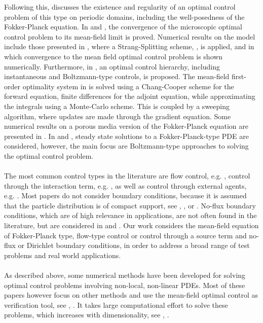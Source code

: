 Following this, \cite{carrillo2019mean} discusses the existence and regularity of an optimal control problem of this type on periodic domains, including the well-posedness of the Fokker-Planck equation. In \cite{Pinnau_2017} and  \cite{carrillo2018no1}, the convergence of the microscopic optimal control problem to its mean-field limit is proved.
Numerical results on the model include those presented in \cite{Pinnau_2017}, where a Strang-Splitting scheme, \cite{gilbertstrang1}, is applied, and in which convergence to the mean field optimal control problem is shown numerically. Furthermore, in \cite{albi2016mean}, an optimal control hierarchy, including instantaneous and Boltzmann-type controls, is proposed. The mean-field first-order optimality system in \cite{albi2016mean} is solved using a Chang-Cooper scheme for the forward equation, finite differences for the adjoint equation, while approximating the integrals using a Monte-Carlo scheme. This is coupled by a sweeping algorithm, where updates are made through the gradient equation.
Some numerical results on a porous media version of the Fokker-Planck equation are presented in \cite{carrillo2018no1}. In \cite{Albi_2014no1} and \cite{albi2014kinetic}, steady state solutions to a Fokker-Planck-type PDE are considered, however, the main focus  are Boltzmann-type approaches to solving the optimal control problem.
\\
\\
The most common control types in the literature are flow control, e.g. \cite{albi2016mean}, control through the interaction term, e.g. \cite{Fornasier_2014no2}, as well as control through external agents, e.g. \cite{burger2016controlling}. 
Most papers do not consider boundary conditions, because it is assumed that the particle distribution is of compact support, see \cite{fornasier_lisini_orrieri_savare_2019}, \cite{burger2019meanfield}, or \cite{burger2016controlling}. No-flux boundary conditions, which are of high relevance in applications, are not often found in the literature, but are considered in \cite{albi2016mean} and \cite{carrillo2018no1}.
Our work considers the mean-field equation of Fokker-Planck type, flow-type control or control through a source term and no-flux or Dirichlet boundary conditions, in order to address a broad range of test problems and real world applications. 
\\
\\
As described above, some numerical methods have been developed for solving optimal control problems involving non-local, non-linear PDEs. Most of these papers however focus on other methods and use the mean-field optimal control as verification tool, see \cite{albi2016mean}, \cite{Pinnau_2017}. It takes large computational effort to solve these problems, which increases with dimensionality, see \cite{burger2019instantaneous}, \cite{burger2016controlling}. 
